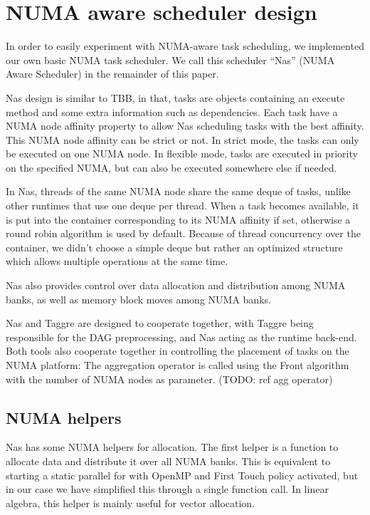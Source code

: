 \section{NUMA aware scheduler design}
In order to easily experiment with NUMA-aware task scheduling, we
implemented our own basic NUMA task scheduler. 
%
We call this scheduler ``Nas'' (NUMA Aware Scheduler) in the remainder of this paper.

Nas design is similar to TBB, in that, tasks are objects containing an execute method and some extra information such as dependencies.
%
Each task have a NUMA node affinity property to allow Nas scheduling tasks with the best affinity.
%
This NUMA node affinity can be strict or not.
%
In strict mode, the tasks can only be executed on one NUMA node.
%
In flexible mode, tasks are executed in priority on the specified NUMA, but can also be executed somewhere else if needed.

In Nas, threads of the same NUMA node share the same deque of tasks, unlike other runtimes that use one deque per thread.
%
When a task becomes available, it is put into the container corresponding to its NUMA affinity if set, otherwise a round robin algorithm is used by default.
%
Because of thread concurrency over the container, we didn't choose a simple deque but rather an optimized structure which allows multiple operations at the same time.

Nas also provides control over data allocation and distribution
among NUMA banks, as well as memory block moves among NUMA banks.

Nas and Taggre are designed to cooperate together, with Taggre being responsible for the DAG preprocessing, and Nas acting as the
runtime back-end. 
%
Both tools also cooperate together in controlling the placement of
tasks on the NUMA platform: The aggregation operator is called using the Front algorithm with the number of NUMA nodes as parameter. (TODO: ref agg operator)

\subsection{NUMA helpers}
\label{NUMA_helper}
Nas has some NUMA helpers for allocation.
%
The first helper is a function to allocate data and distribute it over all NUMA banks.
%
This is equivalent to starting a static parallel for with OpenMP and First Touch policy activated, but in our case we have simplified this through a single function call.
%
In linear algebra, this helper is mainly useful for vector allocation.

